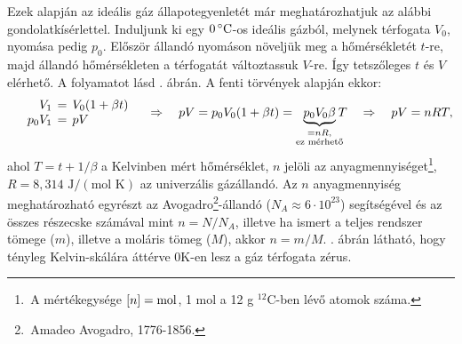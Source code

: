 Ezek alapján az ideális gáz állapotegyenletét már meghatározhatjuk az alábbi gondolatkísérlettel. Induljunk ki egy $0\,^\circ\text C$-os ideális gázból, melynek térfogata $V_0$, nyomása pedig $p_0$. Először állandó nyomáson növeljük meg a hőmérsékletét $t$-re, majd állandó hőmérsékleten a térfogatát változtassuk $V$-re. Így tetszőleges $t$ és $V$ elérhető. A folyamatot lásd . ábrán.
A fenti törvények alapján ekkor:
\begin{align}
    \begin{array}{rcl} V_1\hspace{-2mm} &=& \hspace{-2mm}V_0(1+\beta t)\\ \quad p_0V_1 \hspace{-2mm}&=&\hspace{-2mm} pV\end{array}  \quad\Rightarrow\quad pV = p_0V_0(1+\beta t)=\underbrace{p_0V_0\beta}_{\substack{=nR,\\\textnormal{ez mérhető}}}\hspace{-2mm} T\quad\Rightarrow\quad pV = nRT,
\end{align}
ahol $T = t+1/\beta$ a Kelvinben mért hőmérséklet, $n$ jelöli az anyagmennyiséget\footnote{\,A mértékegysége $[n] = \textnormal{mol}$, 1 mol a 12 g $^{12}$C-ben lévő atomok száma.}, $R=8{,}314 \text{ J}/\left(\text{mol K}\right)$ az univerzális gázállandó. Az $n$ anyagmennyiség meghatározható egyrészt az Avogadro\footnote{\,Amadeo Avogadro, 1776-1856.}-állandó ($N_A \approx 6\cdot 10^{23}$) segítségével és az összes részecske számával mint $n = N/N_A$, illetve ha ismert a teljes rendszer tömege ($m$), illetve a moláris tömeg ($M$), akkor $n = m/M$. . ábrán látható, hogy tényleg Kelvin-skálára áttérve 0K-en lesz a gáz térfogata zérus.
